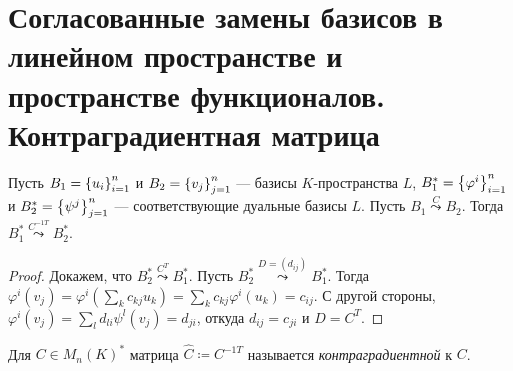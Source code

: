 \section{Согласованные замены базисов в линейном пространстве и пространстве функционалов. Контраградиентная матрица}

\begin{thm*}
    Пусть $B_1 = \left\{u_i\right\}_{i=1}^{n}$ и $B_2 = \left\{v_j\right\}_{j=1}^{n}$ --- базисы $K$-пространства $L$, $B^*_1 = \left\{\varphi^i\right\}_{i=1}^{n}$ и $B^*_2 = \left\{\psi^j\right\}_{j=1}^{n}$ --- соответствующие дуальные базисы $L$. Пусть $B_1 \stackrel{C}{\leadsto} B_2$. Тогда $B_1^* \stackrel{C^{-1T}}{\leadsto} B_2^*$.
\end{thm*}

\begin{proof}
    Докажем, что $B_2^* \stackrel{C^T}{\leadsto} B_1^*$. Пусть $B_2^* \stackrel{D = (d_{ij})}{\leadsto} B_1^*$. Тогда $\varphi^i(v_j) = \varphi^i\left(\sum_k c_{kj} u_k\right) = \sum_k c_{kj} \varphi^i(u_k) = c_{ij}$. С другой стороны, $\varphi^i(v_j) = \sum_l d_{li} \psi^l(v_j) = d_{ji}$, откуда $d_{ij} = c_{ji}$ и $D = C^T$.
\end{proof}

\begin{defn}
    Для $C \in M_n(K)^*$ матрица $\hat{C} \coloneqq C^{-1T}$ называется \textit{контраградиентной} к $C$.
\end{defn}